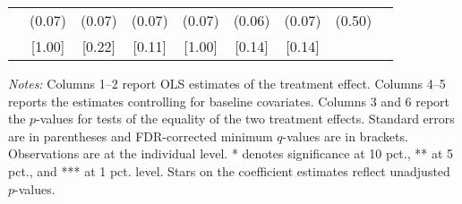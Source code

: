 \begin{table}[h]
{\begin{threeparttable}
\begin{tabular}{l*{8}{c}}
          &   (0.07)&   (0.07)&   (0.07)&   (0.07)&   (0.06)&   (0.07)&   (0.50)&         \\
          &   [1.00]&   [0.22]&   [0.11]&   [1.00]&   [0.14]&   [0.14]&         &         \\
\bottomrule \end{tabular} \begin{tablenotes}[flushleft] \footnotesize \item \emph{Notes:} Columns 1--2 report OLS estimates of the treatment effect. Columns 4--5 reports the estimates controlling for baseline covariates. Columns 3 and 6 report the \(p\)-values for tests of the equality of the two treatment effects. Standard errors are in parentheses and FDR-corrected minimum \(q\)-values are in brackets. Observations are at the individual level. * denotes significance at 10 pct., ** at 5 pct., and *** at 1 pct. level. Stars on the coefficient estimates reflect unadjusted \(p\)-values. \end{tablenotes} \end{threeparttable} } \end{table}

